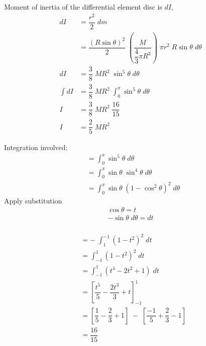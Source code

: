 \documentclass[12 pt]{book}
\newcommand*\Times{\fontfamily{ptm}\selectfont}
\newenvironment{note}
{
	\begin{center}
	\begin{itshape}
	\normalsize\Times\textit{}
}
{
	\end{itshape}
	\end{center}
}
\begin{document}
\pagebreak

\begin{note}
Moment of inertia of the differential element disc is $dI$, 
\begin{align*}
dI &= \dfrac{r^2}{2}  \; dm \\
    &= \dfrac{\left( R\sin\theta \right)^2 }{2} \; \left(  \dfrac{M}{\dfrac{4}{3} \pi R^3} \right)  \; \pi r^2 \; R \sin\theta \; d\theta \\[5 mm]
dI &=\dfrac{3}{8} \; M R^2 \; \sin^5\theta \; d\theta \\[5 mm]
\int dI &=\dfrac{3}{8} \; M R^2 \; \int_0^\pi \sin^5\theta \; d\theta \\[5 mm]
I &= \dfrac{3}{8} \; M R^2 \; \dfrac{16}{15} \\[3 mm]
I &= \dfrac{2}{5} \; M R^2 
\end{align*}
\end{note}

\pagebreak

\begin{note}
Integration involved: 
\begin{align*}
 &= \int_0^\pi \sin^5\theta \; d\theta \\[5 mm]
 &=\int_0^\pi \sin\theta \; \sin^4\theta \; d\theta \\[5 mm]
 &=\int_0^\pi \sin\theta \; \left(1- \cos^2\theta \right)^2 \; d\theta
\end{align*}
Apply substitution
\begin{align*}
\cos\theta = t \\
-\sin\theta \; d\theta = dt \\
\end{align*}

\begin{align*}
&= -\; \int_1^{-1}  (1- t^2)^2 \; dt \\[4 mm]
&=  \int_{-1}^{1}  (1- t^2)^2 \; dt \\[4 mm]
&=  \int_{-1}^{1}  (t^4 -2t^2 + 1) \; dt \\[4 mm]
&=  \left[ \dfrac{t^5}{5} -\dfrac{2t^3}{3} + t \right]_{-1}^1  \\[4 mm]
&=  \left[ \dfrac{1}{5} -\dfrac{2}{3} + 1 \right] \; - \; \left[ \dfrac{-1}{5} +\dfrac{2}{3} - 1 \right] \\[4 mm]
&=  \dfrac{16}{15}
\end{align*}

\end{note}

\pagebreak
\end{document}
